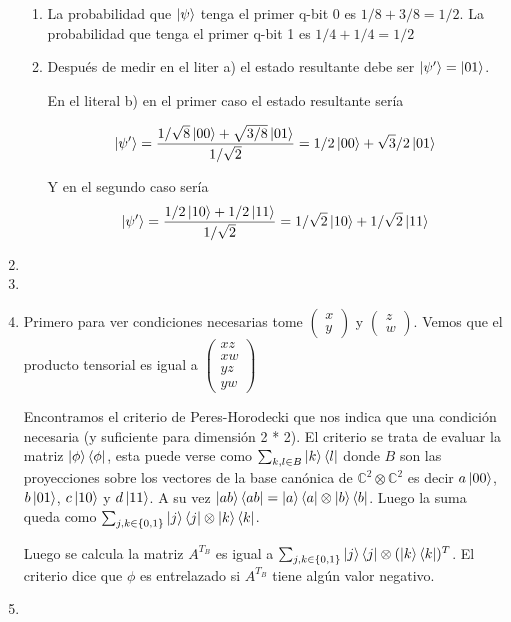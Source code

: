 \documentclass[letter,twoside,12pt]{article}
\begin{document}
\begin{enumerate}
\begin{enumerate}
 \item La probabilidad que $ \ket{\psi} $ tenga el primer q-bit 0 es $ 1/8 + 3/8 = 1/2 $. La probabilidad que tenga el primer q-bit 1 es $ 1/4+1/4 = 1/2 $
 
 \item Después de medir en el liter a) el estado resultante debe ser $ \ket{\psi'}=\ket{01} $.
 
 En el literal b) en el primer caso el estado resultante sería
 
 \begin{equation}
 \ket{\psi'}=\frac{1/\sqrt{8}\ket{00} + \sqrt{3/8}\ket{01}}{1/\sqrt{2}}=1/2\ket{00}+\sqrt{3}/2\ket{01} \nonumber
 \end{equation}
 
 Y en el segundo caso sería
\begin{equation}
\ket{\psi'}=\frac{1/2\ket{10} + 1/2\ket{11}}{1/\sqrt{2}}=1/\sqrt{2}\ket{10}+1/\sqrt{2}\ket{11} \nonumber
\end{equation}
\end{enumerate}

\item 

\item 

\item Primero para ver condiciones necesarias tome $ \begin{pmatrix} x \\ y \end{pmatrix} $ y $ \begin{pmatrix} z \\ w \end{pmatrix} $. Vemos que el producto tensorial es igual a
$ \begin{pmatrix}
xz
\\xw
\\yz
\\yw
\end{pmatrix} $

Encontramos el criterio de Peres-Horodecki que nos indica que una condición necesaria (y suficiente para dimensión 2 * 2). El criterio se trata de evaluar la matriz $ \ket{\phi}\bra{\phi} $, esta puede verse como $ \sum_{k,l\in B}\ket{k}\bra{l} $ donde $B$ son las proyecciones sobre los vectores de la base canónica de $ \mathbb{C}^2 \otimes \mathbb{C}^2$ es decir $ a\ket{00} $, $ b\ket{01} $, $ c\ket{10} $ y $ d\ket{11} $. A su vez $ \ket{ab}\bra{ab}= \ket{a}\bra{a} \otimes \ket{b}\bra{b}$. Luego la suma queda como $ \sum_{j,k\in \{0,1\}} \ket{j}\bra{j} \otimes \ket{k}\bra{k}$.

Luego se calcula la matriz $ A^{T_B} $ es igual a $ \sum_{j,k\in \{0,1\}} \ket{j}\bra{j} \otimes (\ket{k}\bra{k})^T$. El criterio dice que $ \phi $ es entrelazado si $ A^{T_B} $ tiene algún valor negativo.
\item  


\end{enumerate}
\end{document}
